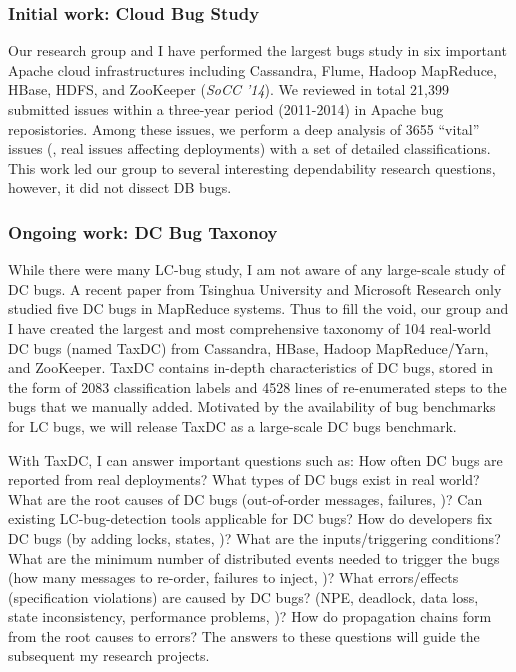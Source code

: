 \documentclass[11pt]{article}
\begin{document}
\subsubsection*{Initial work: Cloud Bug Study}

Our research group and I have performed the largest bugs study in six important
Apache cloud infrastructures including Cassandra, Flume, Hadoop MapReduce,
HBase, HDFS, and ZooKeeper (\textit{SoCC '14}). We reviewed in total 21,399
submitted issues within a three-year period (2011-2014) in Apache bug
reposistories. Among these issues, we perform a deep analysis of 3655 ``vital''
issues (\ie, real issues affecting deployments) with a set of detailed
classifications. This work led our group to several interesting dependability
research questions, however, it did not dissect DB bugs. 

\subsubsection*{Ongoing work: DC Bug Taxonoy} 

While there were many LC-bug study, I am not aware of any large-scale study of
DC bugs. A recent paper from Tsinghua University and Microsoft Research only
studied five DC bugs in MapReduce systems. Thus to fill the void, our group and
I have created the largest and most comprehensive taxonomy of 104 real-world DC
bugs (named TaxDC) from Cassandra, HBase, Hadoop MapReduce/Yarn, and ZooKeeper.
TaxDC contains in-depth characteristics of DC bugs, stored in the form of 2083
classification labels and 4528 lines of re-enumerated steps to the bugs that we
manually added. Motivated by the availability of bug benchmarks for LC bugs, we
will release TaxDC as a large-scale DC bugs benchmark.

With TaxDC, I can answer important questions such as: How often DC bugs are
reported from real deployments? What types of DC bugs exist in real world?  What
are the root causes of DC bugs (out-of-order messages, failures, \etc)? Can
existing LC-bug-detection tools applicable for DC bugs? How do developers fix DC
bugs (by adding locks, states, \etc)? What are the inputs/triggering conditions?
What are the minimum number of distributed events needed to trigger the bugs
(how many messages to re-order, failures to inject, \etc)? What errors/effects
(specification violations) are caused by DC bugs? (NPE, deadlock, data loss,
state inconsistency, performance problems, \etc)? How do propagation chains form
from the root causes to errors? The answers to these questions will guide the
subsequent my research projects.
\end{document}
